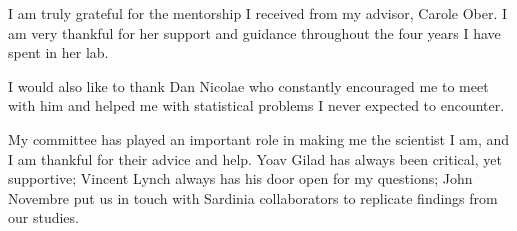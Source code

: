 \acknowledgments

I am truly grateful for the mentorship I received from my advisor, Carole Ober. I am very thankful for her support and guidance throughout the four years I have spent in her lab. 

I would also like to thank Dan Nicolae who constantly encouraged me to meet with him and helped me with statistical problems I never expected to encounter. 

My committee has played an important role in making me the scientist I am, and I am thankful for their advice and help. Yoav Gilad has always been critical, yet supportive; Vincent Lynch always has his door open for my questions; John Novembre put us in touch with Sardinia collaborators to replicate findings from our studies.